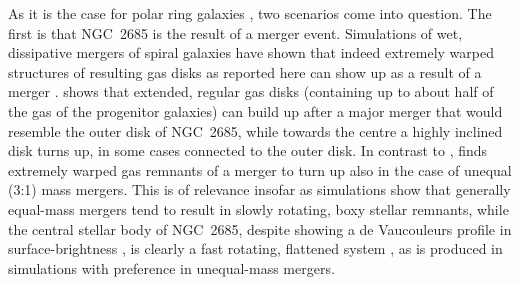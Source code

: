 \documentclass[oldversion]{aa}
\begin{document}
As it is the case for polar ring galaxies
\citep[e.g.][]{Bekki97,Bournaud03}, two scenarios come into
question. The first is that NGC~2685 is the result of a merger
event. Simulations of wet, dissipative mergers of spiral galaxies have
shown that indeed extremely warped structures of resulting gas disks
as reported here can show up as a result of a merger \citep[][Fig.~2
therein showing a case with a gas structure very similar to that of
NGC~2685]{Barnes02,Naab06}. \citet[][]{Barnes02} shows that extended,
regular gas disks (containing up to about half of the gas of the
progenitor galaxies) can build up after a major merger that would
resemble the outer  disk of NGC~2685, while towards the
centre a highly inclined disk turns up, in some cases connected to the
outer disk. In contrast to \citet[][]{Naab06}, \citet[][]{Barnes02}
finds extremely warped gas remnants of a merger to turn up also in the
case of unequal (3:1) mass mergers. This is of relevance insofar as
simulations
\citep[][]{Naab99,Naab03} show that generally equal-mass mergers tend
to result in slowly rotating, boxy stellar remnants, while the central
stellar body of NGC~2685, despite showing a de Vaucouleurs profile in
surface-brightness \citep[][]{Peletier93}, is clearly a fast rotating,
flattened system \citep[][]{Emsellem04}, as is produced in simulations
with preference in unequal-mass mergers.
\end{document}
